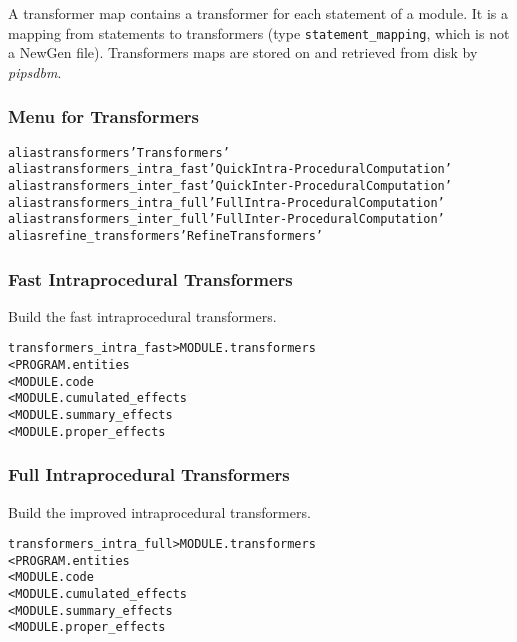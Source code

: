 \documentclass[a4paper]{report}
\newenvironment{PipsMake}{\begin{alltt}}{\end{alltt}}
\begin{document}
A transformer map contains a transformer for each statement of a
module. It is a mapping from statements to transformers (type
\verb+statement_mapping+, which is not a NewGen file). Transformers maps
are stored on and retrieved from disk by {\em pipsdbm}.


\subsubsection{Menu for Transformers}

\begin{PipsMake}
alias transformers 'Transformers'
alias transformers_intra_fast 'Quick Intra-Procedural Computation'
alias transformers_inter_fast 'Quick Inter-Procedural Computation'
alias transformers_intra_full 'Full Intra-Procedural Computation'
alias transformers_inter_full 'Full Inter-Procedural Computation'
alias refine_transformers 'Refine Transformers'
\end{PipsMake}

\subsubsection{Fast Intraprocedural Transformers}

Build the fast intraprocedural transformers.

\begin{PipsMake}
transformers_intra_fast         > MODULE.transformers
        < PROGRAM.entities
        < MODULE.code
        < MODULE.cumulated_effects
        < MODULE.summary_effects
        < MODULE.proper_effects
\end{PipsMake}

\subsubsection{Full Intraprocedural Transformers}
               
Build the improved intraprocedural transformers.

\begin{PipsMake}
transformers_intra_full         > MODULE.transformers
        < PROGRAM.entities
        < MODULE.code
        < MODULE.cumulated_effects
        < MODULE.summary_effects
        < MODULE.proper_effects
\end{PipsMake}
\end{document}
